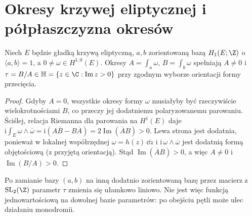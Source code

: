 \section{Okresy krzywej eliptycznej i półpłaszczyzna okresów}
\begin{stwierdzenie}
Niech $E$ będzie gładką krzywą eliptyczną, $a,b$ zorientowaną
bazą $H_1(E;\Z)$ o $\langle a,b\rangle=1$, a
$0\ne\omega\in H^{1,0}(E)$. Okresy
$A=\int_a\omega$, $B=\int_b\omega$ spełniają $A\ne0$ i
$\tau=B/A\in\mathbb H=\{z\in\C:\operatorname{Im}z>0\}$
przy zgodnym wyborze orientacji formy przecięcia.
\end{stwierdzenie}
\begin{proof}
Gdyby $A=0$, wszystkie okresy formy $\omega$ musiałyby
być rzeczywiście wielokrotnościami $B$, co przeczy
jej dodatniemu polaryzowanemu parowaniu.
Ściślej, relacja Riemanna dla parowania na $H^1(E)$ daje
$\mathrm i\int_E\omega\wedge\overline\omega
=\mathrm i(A\overline B-B\overline A)=2\operatorname{Im}(\overline A B)>0$.
Lewa strona jest dodatnia, ponieważ w lokalnej
współrzędnej $\omega=h(z)\,\dd z$ i
$\mathrm i\,\omega\wedge\overline\omega$
jest dodatnią formą objętościową (z przyjętą orientacją).
Stąd $\operatorname{Im}(\overline AB)>0$, a więc $A\ne0$
i $\operatorname{Im}(B/A)>0$.
\end{proof}
\begin{uwaga}
Po zamianie bazy $(a,b)$ na inną dodatnio zorientowaną
bazę przez macierz z $\mathrm{SL}_2(\Z)$ parametr
$\tau$ zmienia się ułamkowo liniowo. Nie jest więc
funkcją jednowartościową na dowolnej bazie parametrów:
po obejściu pętli może ulec działaniu monodromii.
\end{uwaga}

